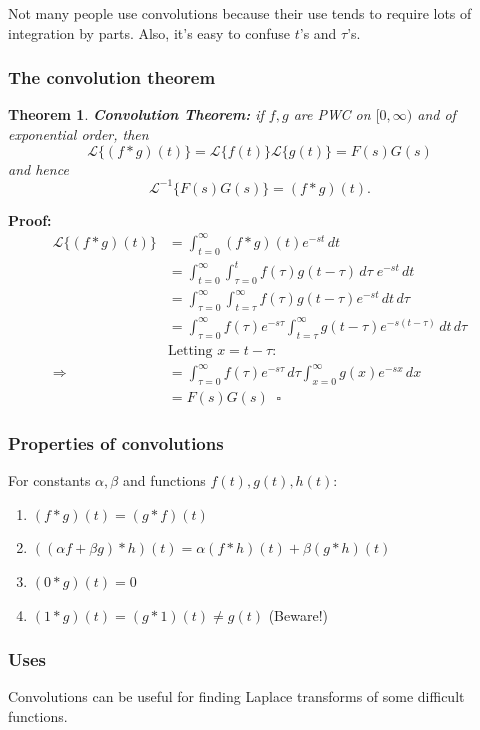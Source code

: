\documentclass[11pt]{article}
\newtheorem{thm}{Theorem}[section]
\newcommand{\lap}{\mathcal{L}}
\newcommand{\lapft}{\lap\{f(t)\}}
\newcommand{\lapi}{\lap^{-1}}
\begin{document}
	Not many people use convolutions because their use tends to require lots of integration by parts. Also, it's easy to confuse $t$'s and $\tau$'s.

\subsubsection{The convolution theorem}
	\begin{thm}
		\textbf{Convolution Theorem:} if $f,g$ are PWC on $[0,\infty)$ and of exponential order, then
			$$ \lap\{(f*g)(t)\} = \lapft \lap\{g(t)\} = F(s) G(s) $$
		and hence
			$$ \lapi \{F(s)G(s)\} = (f * g)(t).$$
	\end{thm}

	\textbf{Proof:}
		\begin{align*}
			\lap\{(f*g)(t)\} &= \int_{t=0}^{\infty} (f*g)(t) e^{-st} \,dt \\
				&= \int_{t=0}^{\infty} \int_{\tau=0}^t f(\tau) g (t-\tau) \,d\tau \; e^{-st} \,dt \\
				&= \int_{\tau=0}^{\infty} \int_{t = \tau}^{\infty} f(\tau) g(t-\tau) e^{-st} \,dt\,d\tau \\
				&= \int_{\tau=0}^{\infty} f(\tau)e^{-s\tau} \int_{t = \tau}^{\infty} g(t-\tau) e^{-s(t-\tau)}\,dt\,d\tau \\
				&\text{Letting $x = t-\tau$:} \\
			\Rightarrow &= \int_{\tau=0}^{\infty} f(\tau)e^{-s\tau} \,d\tau \int_{x=0}^{\infty} g(x) e^{-sx} \,dx \\
			&= F(s) G(s) \; \; \square
		\end{align*}
\subsubsection{Properties of convolutions}
	For constants $\alpha, \beta$ and functions $f(t), g(t), h(t)$:
	\begin{enumerate}
		\item $(f*g)(t) = (g*f)(t)$
		\item $((\alpha f + \beta g) * h)(t) = \alpha (f*h)(t) + \beta (g*h)(t)$
		\item $(0*g)(t) = 0$
		\item $(1*g)(t) = (g*1)(t) \neq g(t)$ (Beware!)
	\end{enumerate}

\subsubsection{Uses}
	Convolutions can be useful for finding Laplace transforms of some difficult functions.
\end{document}
